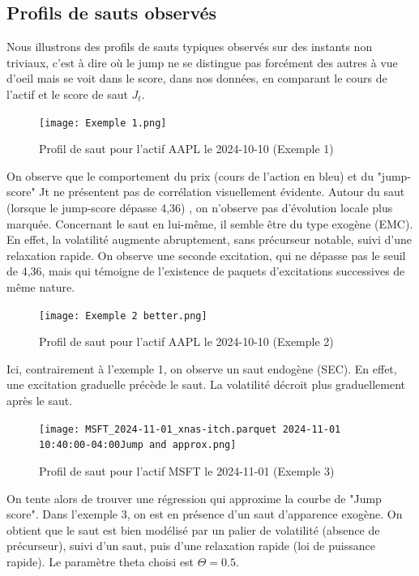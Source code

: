 \documentclass[10pt,a4paper]{article}
\theoremstyle{definition}
\theoremstyle{remark}
\begin{document}
    \subsection{Profils de sauts observés}

    Nous illustrons des profils de sauts typiques observés sur des instants non triviaux, c'est à dire où le jump ne se distingue pas forcément des autres à vue d'oeil mais se voit dans le score, dans nos données, en comparant le cours de l'actif et le score de saut $J_t$.

    \begin{figure}[H]
        \centering
        \texttt{[image: Exemple 1.png]}
        \caption{Profil de saut pour l'actif AAPL le 2024-10-10 (Exemple 1)}
        \label{fig:jump_example_1}
    \end{figure}
    
    On observe que le comportement du prix (cours de l'action en bleu) et du "jump-score" Jt ne présentent pas de corrélation visuellement évidente. Autour du saut (lorsque le jump-score dépasse 4,36) , on n'observe pas d'évolution locale plus marquée. Concernant le saut en lui-même, il semble être du type exogène (EMC). En effet, la volatilité augmente abruptement, sans précurseur notable, suivi d'une relaxation rapide. On observe une seconde excitation, qui ne dépasse pas le seuil de 4,36, mais qui témoigne de l'existence de paquets d'excitations successives de même nature. 

    \vspace{1cm}

    \begin{figure}[H]
        \centering
        \texttt{[image: Exemple 2 better.png]}
        \caption{Profil de saut pour l'actif AAPL le 2024-10-10 (Exemple 2)}
        \label{fig:jump_example_2}
    \end{figure}

    Ici, contrairement à l'exemple 1, on observe un saut endogène (SEC). En effet, une excitation graduelle précède le saut. La volatilité décroit plus graduellement après le saut. 
    

    \vspace{1cm}

    \begin{figure}[H]
        \centering
        \texttt{[image: MSFT\_2024-11-01\_xnas-itch.parquet 2024-11-01 10:40:00-04:00Jump and approx.png]}
        \caption{Profil de saut pour l'actif MSFT le 2024-11-01 (Exemple 3)}
        \label{fig:jump_example_3}
    \end{figure}
    On tente alors de trouver une régression qui approxime la courbe de "Jump score". Dans l'exemple 3, on est en présence d'un saut d'apparence exogène. On obtient que le saut est bien modélisé par un palier de volatilité (absence de précurseur), suivi d'un saut, puis d'une relaxation rapide (loi de puissance rapide). Le paramètre theta choisi est $\Theta = 0.5$. 
\end{document}
